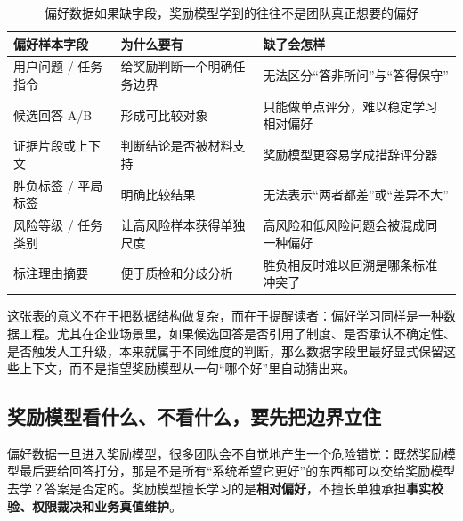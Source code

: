 \begin{table}[H]
\centering
\small
\begin{tabularx}{\textwidth}{>{\raggedright\arraybackslash}p{2.8cm}>{\raggedright\arraybackslash}p{3.2cm}>{\raggedright\arraybackslash}X}
\toprule
\textbf{偏好样本字段} & \textbf{为什么要有} & \textbf{缺了会怎样} \\
\midrule
用户问题 / 任务指令 & 给奖励判断一个明确任务边界 & 无法区分“答非所问”与“答得保守” \\
候选回答 A/B & 形成可比较对象 & 只能做单点评分，难以稳定学习相对偏好 \\
证据片段或上下文 & 判断结论是否被材料支持 & 奖励模型更容易学成措辞评分器 \\
胜负标签 / 平局标签 & 明确比较结果 & 无法表示“两者都差”或“差异不大” \\
风险等级 / 任务类别 & 让高风险样本获得单独尺度 & 高风险和低风险问题会被混成同一种偏好 \\
标注理由摘要 & 便于质检和分歧分析 & 胜负相反时难以回溯是哪条标准冲突了 \\
\bottomrule
\end{tabularx}
\caption{偏好数据如果缺字段，奖励模型学到的往往不是团队真正想要的偏好}
\label{tab:preference-sample-schema}
\end{table}

这张表的意义不在于把数据结构做复杂，而在于提醒读者：偏好学习同样是一种数据工程。尤其在企业场景里，如果候选回答是否引用了制度、是否承认不确定性、是否触发人工升级，本来就属于不同维度的判断，那么数据字段里最好显式保留这些上下文，而不是指望奖励模型从一句“哪个好”里自动猜出来。

\subsection{奖励模型看什么、不看什么，要先把边界立住}
偏好数据一旦进入奖励模型，很多团队会不自觉地产生一个危险错觉：既然奖励模型最后要给回答打分，那是不是所有“系统希望它更好”的东西都可以交给奖励模型去学？答案是否定的。奖励模型擅长学习的是\textbf{相对偏好}，不擅长单独承担\textbf{事实校验、权限裁决和业务真值维护}。

